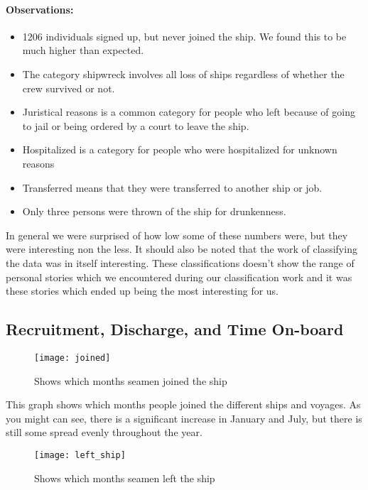 \documentclass{article}
\begin{document}
\paragraph{Observations:}
\begin{itemize}
	\item 1206 individuals signed up, but never joined the ship. We found this to be much higher than expected.
	\item The category shipwreck involves all loss of ships regardless of whether the crew survived or not.
	\item Juristical reasons is a common category for people who left because of going to jail or being ordered by a court to leave the ship.
	\item Hospitalized is a category for people who were hospitalized for unknown reasons
	\item Transferred means that they were transferred to another ship or job.
	\item Only three persons were thrown of the ship for drunkenness.
\end{itemize}

In general we were surprised of how low some of these numbers were, but they were interesting non the less.
It should also be noted that the work of classifying the data was in itself interesting.
These classifications doesn't show the range of personal stories which we encountered during our classification work and it was these stories which ended up being the most interesting for us.

\subsection{Recruitment, Discharge, and Time On-board}

\begin{figure}[H]
	\centering
    \texttt{[image: joined]}
  	\caption{Shows which months seamen joined the ship}
\end{figure}

This graph shows which months people joined the different ships and voyages. As you might can see, there is a significant increase in January and July, but there is still some spread evenly throughout the year.

\begin{figure}[H]
	\centering
	\texttt{[image: left\_ship]}
  	\caption{Shows which months seamen left the ship}
\end{figure}
\end{document}
